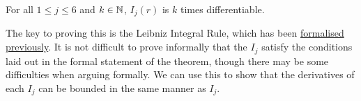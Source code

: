 \begin{boxlemma}\label{Ch4:Lemma:Ij_Smooth}
    For all $1 \leq j \leq 6$ and $k \in \mathbb{N}$, $I_j(r)$ is $k$ times differentiable.
\end{boxlemma}
The key to proving this is the Leibniz Integral Rule, which has been \href{https://github.com/leanprover-community/mathlib4/blob/dd2606726d6b0601d394911f9e7a6fa0f01367a3/Mathlib/Analysis/Calculus/ParametricIntegral.lean#L281-L303}{formalised previously}. It is not difficult to prove informally that the $I_j$ satisfy the conditions laid out in the formal statement of the theorem, though there may be some difficulties when arguing formally. We can use this to show that the derivatives of each $I_j$ can be bounded in the same manner as $I_j$.


